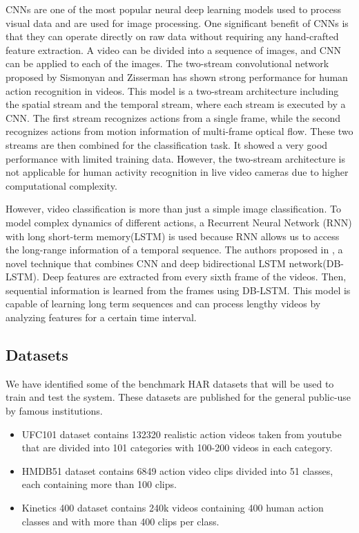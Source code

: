 \documentclass[twocolumn]{article}
\begin{document}
CNNs are one of the most popular neural deep learning models used to process visual data and are used for image processing. One significant benefit of CNNs
is that they can operate directly on raw data without requiring any hand-crafted feature extraction. A video can be divided into a sequence of images, and CNN 
can be applied to each of the images. The two-stream convolutional network proposed by Sismonyan and Zisserman \cite{b4} has shown strong performance
for human action recognition in videos. This model is a two-stream architecture including the spatial stream and the temporal stream, where each stream is executed by a
CNN. The first stream recognizes actions from a single frame, while the second recognizes actions from motion information of multi-frame optical flow. These two streams
are then combined for the classification task. It showed a very good performance with limited training data. However, the two-stream architecture is not applicable for human
activity recognition in live video cameras due to higher computational complexity.

However, video classification is more than just a simple image classification. To model complex dynamics of different actions, a Recurrent Neural Network (RNN) with long short-term memory(LSTM)
is used because RNN allows us to access the long-range information of a temporal sequence. 
The authors proposed in \cite{b5}, a novel technique that combines CNN and deep bidirectional LSTM network(DB-LSTM). Deep features are extracted from every sixth frame of the
videos. Then, sequential information is learned from the frames using DB-LSTM. This model is capable of learning long term sequences and can process lengthy videos 
by analyzing features for a certain time interval.

\subsection{Datasets}
We have identified some of the benchmark HAR datasets that will be used to train and test the system. These datasets are published for the general public-use by famous
institutions.
\begin{itemize}
\item \cite{b6} UFC101 dataset contains 132320 realistic action videos taken from youtube that are divided into 101 categories with 100-200 videos in each category.
\item \cite{b7} HMDB51 dataset contains 6849 action video clips divided into 51 classes, each containing more than 100 clips.
\item \cite{b8} Kinetics 400 dataset contains 240k videos containing 400 human action classes and with more than 400 clips per class.
\end{itemize}
\end{document}
